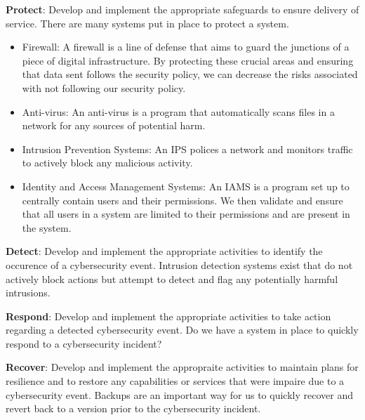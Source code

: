 \documentclass[11pt]{article}
\begin{document}
\textbf{Protect}: Develop and implement the appropriate safeguards to ensure delivery of service.
There are many systems put in place to protect a system.
\begin{itemize}
    \item Firewall: A firewall is a line of defense that aims to guard the junctions of a piece of digital infrastructure. 
          By protecting these crucial areas and ensuring that data sent follows the security policy, we can decrease the risks associated with not following our security policy.
    \item Anti-virus: An anti-virus is a program that automatically scans files in a network for any sources of potential harm.
    \item Intrusion Prevention Systems: An IPS polices a network and monitors traffic to actively block any malicious activity.
    \item Identity and Access Management Systems: An IAMS is a program set up to centrally contain users and their permissions. 
          We then validate and ensure that all users in a system are limited to their permissions and are present in the system.
\end{itemize}

\textbf{Detect}: Develop and implement the appropriate activities to identify the occurence of a cybersecurity event.
Intrusion detection systems exist that do not actively block actions but attempt to detect and flag any potentially harmful intrusions.

\textbf{Respond}: Develop and implement the appropriate activities to take action regarding a detected cybersecurity event.
Do we have a system in place to quickly respond to a cybersecurity incident?

\textbf{Recover}: Develop and implement the appropraite activities to maintain plans for resilience and to restore any capabilities or services that were impaire due to a cybersecurity event.
Backups are an important way for us to quickly recover and revert back to a version prior to the cybersecurity incident.
\end{document}
